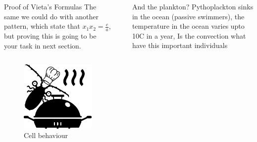 \documentclass[final]{beamer}
\newlength{\sepwid}
\newlength{\onecolwid}
\newlength{\twocolwid}
\begin{document}
\begin{frame}[t]
\begin{columns}[t]
\begin{column}{\twocolwid}
\begin{columns}[t,totalwidth=\twocolwid]
\begin{column}{\onecolwid}
\begin{block}{ Proof of Vieta's Formulas}
The same we could do with another pattern, which state that $x_1 x_2 = \frac{c}{a}$, but proving this is going to be your task in next section.

\end{block}


\end{column} %

\end{columns} %

\begin{figure}
\includegraphics[width=0.5\linewidth]{images/planktonBBQRCropped.pdf}
\caption{Cell behaviour}
\end{figure}

\end{column} %

\begin{column}{\sepwid}\end{column} %

\begin{column}{\onecolwid} %


\begin{block}{And the plankton?}
\textbf{}
	Pythoplackton sinks in the ocean (passive swimmers), 
the temperature in the ocean varies upto 10C in a year,
Is the convection what have this important individuals
\[\]

\end{block}



\end{column}
\end{columns}
\end{frame}
\end{document}
